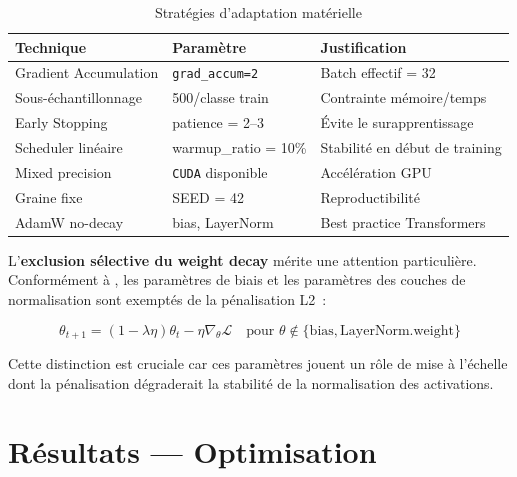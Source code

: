 \documentclass[12pt,a4paper]{article}
\begin{document}
\begin{table}[H]
  \centering
  \caption{Stratégies d'adaptation matérielle}
  \label{tab:adaptation}
  \begin{tabular}{lll}
    \toprule
    \textbf{Technique} & \textbf{Paramètre} & \textbf{Justification} \\
    \midrule
    Gradient Accumulation   & \texttt{grad\_accum=2}      & Batch effectif = 32 \\
    Sous-échantillonnage    & 500/classe train             & Contrainte mémoire/temps \\
    Early Stopping          & patience = 2--3              & Évite le surapprentissage \\
    Scheduler linéaire      & warmup\_ratio = 10\%         & Stabilité en début de training \\
    Mixed precision         & \texttt{CUDA} disponible     & Accélération GPU \\
    Graine fixe             & SEED = 42                    & Reproductibilité \\
    AdamW no-decay          & bias, LayerNorm              & Best practice Transformers \\
    \bottomrule
  \end{tabular}
\end{table}

L'\textbf{exclusion sélective du weight decay} mérite une attention particulière.
Conformément à \citet{loshchilov2019decoupled}, les paramètres de biais et les
paramètres des couches de normalisation sont exemptés de la pénalisation L2~:

\begin{equation}
  \label{eq:adamw}
  \theta_{t+1} = (1 - \lambda\eta) \theta_t - \eta \nabla_\theta \mathcal{L}
  \quad \text{pour } \theta \notin \{\text{bias}, \text{LayerNorm.weight}\}
\end{equation}

Cette distinction est cruciale car ces paramètres jouent un rôle de mise à l'échelle
dont la pénalisation dégraderait la stabilité de la normalisation des activations.

\section{Résultats — Optimisation}
\label{sec:resultats_optim}
\end{document}
